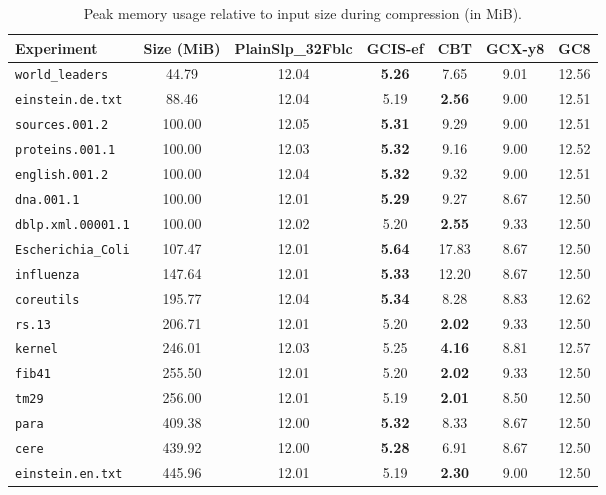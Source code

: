 \begin{table}[t]
\caption{Peak memory usage relative to input size during compression (in MiB). }
\label{t:memory-usage}
\centering
\setlength{\tabcolsep}{5pt}
\begin{tabular}{|l|c|c|c|c|c|c|}
\hline
Experiment & Size (MiB) & PlainSlp_32Fblc & GCIS-ef & CBT & GCX-y8 & GC8 \\
\hline
\texttt{world\_leaders} & 44.79 & 12.04 & \textbf{5.26} & 7.65 & 9.01 & 12.56 \\
\texttt{einstein.de.txt} & 88.46 & 12.04 & 5.19 & \textbf{2.56} & 9.00 & 12.51 \\
\texttt{sources.001.2} & 100.00 & 12.05 & \textbf{5.31} & 9.29 & 9.00 & 12.51 \\
\texttt{proteins.001.1} & 100.00 & 12.03 & \textbf{5.32} & 9.16 & 9.00 & 12.52 \\
\texttt{english.001.2} & 100.00 & 12.04 & \textbf{5.32} & 9.32 & 9.00 & 12.51 \\
\texttt{dna.001.1} & 100.00 & 12.01 & \textbf{5.29} & 9.27 & 8.67 & 12.50 \\
\texttt{dblp.xml.00001.1} & 100.00 & 12.02 & 5.20 & \textbf{2.55} & 9.33 & 12.50 \\
\texttt{Escherichia\_Coli} & 107.47 & 12.01 & \textbf{5.64} & 17.83 & 8.67 & 12.50 \\
\texttt{influenza} & 147.64 & 12.01 & \textbf{5.33} & 12.20 & 8.67 & 12.50 \\
\texttt{coreutils} & 195.77 & 12.04 & \textbf{5.34} & 8.28 & 8.83 & 12.62 \\
\texttt{rs.13} & 206.71 & 12.01 & 5.20 & \textbf{2.02} & 9.33 & 12.50 \\
\texttt{kernel} & 246.01 & 12.03 & 5.25 & \textbf{4.16} & 8.81 & 12.57 \\
\texttt{fib41} & 255.50 & 12.01 & 5.20 & \textbf{2.02} & 9.33 & 12.50 \\
\texttt{tm29} & 256.00 & 12.01 & 5.19 & \textbf{2.01} & 8.50 & 12.50 \\
\texttt{para} & 409.38 & 12.00 & \textbf{5.32} & 8.33 & 8.67 & 12.50 \\
\texttt{cere} & 439.92 & 12.00 & \textbf{5.28} & 6.91 & 8.67 & 12.50 \\
\texttt{einstein.en.txt} & 445.96 & 12.01 & 5.19 & \textbf{2.30} & 9.00 & 12.50 \\
\hline
\end{tabular}
\end{table}